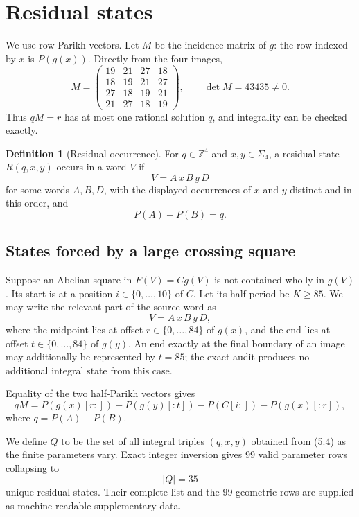 \documentclass[11pt]{article}
\theoremstyle{definition}
\newtheorem{definition}[theorem]{Definition}
\newcommand{\Par}{P}
\begin{document}
\section{Residual states}

We use row Parikh vectors. Let $M$ be the incidence matrix of $g$: the row indexed by $x$ is $\Par(g(x))$. Directly from the four images,
\[
M=
\begin{pmatrix}
19&21&27&18\\
18&19&21&27\\
27&18&19&21\\
21&27&18&19
\end{pmatrix},
\qquad
\det M=43435\ne0.
\tag{5.1}
\]
Thus $qM=r$ has at most one rational solution $q$, and integrality can be checked exactly.

\begin{definition}[Residual occurrence]
For $q\in\mathbb Z^4$ and $x,y\in\Sigma_4$, a residual state $R(q,x,y)$ occurs in a word $V$ if
\[
V=A\,x\,B\,y\,D
\tag{5.2}
\]
for some words $A,B,D$, with the displayed occurrences of $x$ and $y$ distinct and in this order, and
\[
\Par(A)-\Par(B)=q.
\tag{5.3}
\]
\end{definition}

\subsection{States forced by a large crossing square}

Suppose an Abelian square in $F(V)=Cg(V)$ is not contained wholly in $g(V)$. Its start is at a position $i\in\{0,\ldots,10\}$ of $C$. Let its half-period be $K\ge85$. We may write the relevant part of the source word as
\[
V=A\,x\,B\,y\,D,
\]
where the midpoint lies at offset $r\in\{0,\ldots,84\}$ of $g(x)$, and the end lies at offset $t\in\{0,\ldots,84\}$ of $g(y)$. An end exactly at the final boundary of an image may additionally be represented by $t=85$; the exact audit produces no additional integral state from this case.

Equality of the two half-Parikh vectors gives
\[
qM=
\Par(g(x)[r:])+\Par(g(y)[:t])
-\Par(C[i:])-\Par(g(x)[:r]),
\tag{5.4}
\]
where $q=\Par(A)-\Par(B)$.

We define $Q$ to be the set of all integral triples $(q,x,y)$ obtained from (5.4) as the finite parameters vary. Exact integer inversion gives 99 valid parameter rows collapsing to
\[
|Q|=35
\tag{5.5}
\]
unique residual states. Their complete list and the 99 geometric rows are supplied as machine-readable supplementary data.
\end{document}
